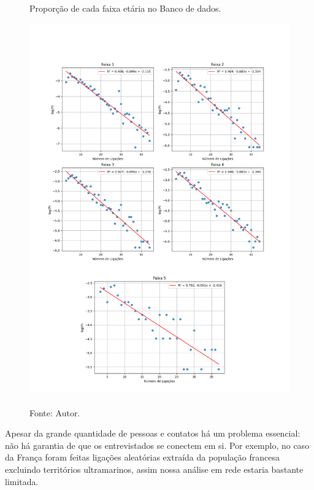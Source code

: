 \begin{figure}[H]
  \centering
  \captionsetup{font=normalsize,skip=1pt,singlelinecheck=on,labelsep=endash}

  \caption{Proporção de cada faixa etária no Banco de dados.}

  \includegraphics[scale=0.5]{./img/contatos_faixa.png}
  \captionsetup{font=small,position=below,skip=-1pt}
   \caption*{\\Fonte: Autor.}
   \label{contatos_faixas}
\end{figure}


Apesar da grande quantidade de pessoas e contatos há um problema essencial: não há garantia de que os entrevistados se conectem em si. Por exemplo, no caso da França \cite{France} foram feitas ligações aleatórias extraída da população francesa excluindo territórios ultramarinos, assim nossa análise em rede estaria bastante limitada.

